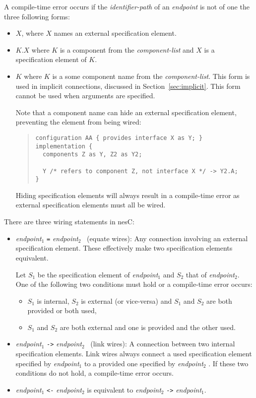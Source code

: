 \documentclass[11pt,letterpaper]{article}
\newcommand{\code}[1]{{\tt #1}}
\newcommand{\nesc}{nesC\xspace}
\begin{document}
A compile-time error occurs if the \emph{identifier-path} of an
\emph{endpoint} is not of one the three following forms:
\begin{itemize}
\item $X$, where $X$ names an external specification element.
\item $K.X$ where $K$ is a component from the \emph{component-list} and
$X$ is a specification element of $K$.
\item $K$ where $K$ is a some component name from the
\emph{component-list}.  This form is used in implicit connections,
discussed in Section~\ref{sec:implicit}. This form cannot be used when
arguments are specified.

Note that a component name can hide an external specification element,
preventing the element from being wired:
\begin{quote}
\begin{verbatim}
configuration AA { provides interface X as Y; }
implementation {
  components Z as Y, Z2 as Y2;

  Y /* refers to component Z, not interface X */ -> Y2.A;
}
\end{verbatim}
\end{quote}
Hiding specification elements will always result in a compile-time error as
external specification elements must all be wired.
\end{itemize}

There are three wiring statements in \nesc:
\begin{itemize}
\item \emph{endpoint}$_1$ \code{=} \emph{endpoint}$_2$ \ (equate wires):
Any connection involving an external specification element. These
effectively make two specification elements equivalent.

Let $S_1$ be the specification element of \emph{endpoint}$_1$ and $S_2$
that of \emph{endpoint}$_2$. One of the following two conditions must hold
or a compile-time error occurs:
\begin{itemize}
\item $S_1$ is internal, $S_2$ is external (or vice-versa) and $S_1$ and
$S_2$ are both provided or both used,
\item $S_1$ and $S_2$ are both external and one is provided and the other used.
\end{itemize}

\item \emph{endpoint}$_1$ \code{->} \emph{endpoint}$_2$ \ (link wires): A
connection between two internal specification elements. Link wires always
connect a used specification element specified by \emph{endpoint}$_1$ to a
provided one specified by \emph{endpoint}$_2$ . If these two conditions do
not hold, a compile-time error occurs.

\item \emph{endpoint}$_1$ \code{<-} \emph{endpoint}$_2$ is equivalent to
\emph{endpoint}$_2$ \code{->} \emph{endpoint}$_1$.
\end{itemize}
\end{document}

